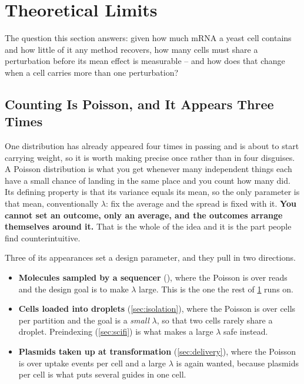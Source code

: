 
\section{Theoretical Limits}
\label{sec:limits}

The question this section answers: given how much mRNA a yeast cell contains and
how little of it any method recovers, how many cells must share a perturbation
before its mean effect is measurable -- and how does that change when a cell
carries more than one perturbation?

\subsection{Counting Is Poisson, and It Appears Three Times}
\label{sec:poisson}

One distribution has already appeared four times in passing and is about to start
carrying weight, so it is worth making precise once rather than in four disguises.
A Poisson distribution is what you get whenever many independent things each have
a small chance of landing in the same place and you count how many did. Its
defining property is that its variance equals its mean, so the only parameter is
that mean, conventionally $\lambda$: fix the average and the spread is fixed with
it. \textbf{You cannot set an outcome, only an average, and the outcomes arrange
themselves around it.} That is the whole of the idea and it is the part people
find counterintuitive.

Three of its appearances set a design parameter, and they pull in two directions.

\begin{itemize}[leftmargin=1.2em,itemsep=1pt,topsep=2pt]
  \item \textbf{Molecules sampled by a sequencer} (), where the
    Poisson is over reads and the design goal is to make $\lambda$ large. This is
    the one the rest of \cref{sec:limits} runs on.
  \item \textbf{Cells loaded into droplets} (\cref{sec:isolation}), where the
    Poisson is over cells per partition and the goal is a \emph{small} $\lambda$,
    so that two cells rarely share a droplet. Preindexing (\cref{sec:scifi}) is
    what makes a large $\lambda$ safe instead.
  \item \textbf{Plasmids taken up at transformation} (\cref{sec:delivery}), where
    the Poisson is over uptake events per cell and a large $\lambda$ is again
    wanted, because plasmids per cell is what puts several guides in one cell.
\end{itemize}

